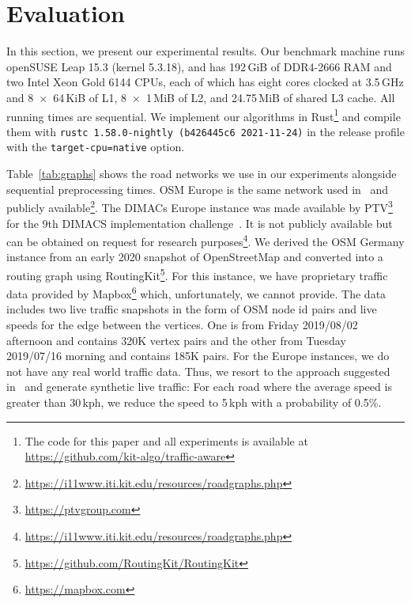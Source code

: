 \documentclass[a4paper,UKenglish,cleveref, autoref, thm-restate]{lipics-v2021}
\begin{document}
\section{Evaluation}\label{sec:eval}

In this section, we present our experimental results.
Our benchmark machine runs openSUSE Leap 15.3 (kernel 5.3.18), and has 192\,GiB of DDR4-2666 RAM and two Intel Xeon Gold 6144 CPUs, each of which has eight cores clocked at 3.5\,GHz and 8~$\times$~64\,KiB of L1, 8~$\times$~1\,MiB of L2, and 24.75\,MiB of shared L3 cache.
All running times are sequential.
We implement our algorithms in Rust\footnote{The code for this paper and all experiments is available at \url{https://github.com/kit-algo/traffic-aware}} and compile them with \texttt{rustc 1.58.0-nightly (b426445c6 2021-11-24)} in the release profile with the \texttt{target-cpu=native} option.

\begin{table}
\centering
\caption{
Instances used in the evaluation with sequential preprocessing running times to construct a CCH-Potential.
Phase 1 needs to be run only once for each graph, Phase 2 once for each metric, or when a metric changes.
}\label{tab:graphs}

\end{table}

Table~\ref{tab:graphs} shows the road networks we use in our experiments alongside sequential preprocessing times.
OSM Europe is the same network used in~\cite{dss-tarrn-18} and publicly available\footnote{\url{https://i11www.iti.kit.edu/resources/roadgraphs.php}}.
The DIMACs Europe instance was made available by PTV\footnote{\url{https://ptvgroup.com}} for the 9th DIMACS implementation challenge~\cite{DemetrescuGJ09}.
It is not publicly available but can be obtained on request for research purposes\footnote{\url{https://i11www.iti.kit.edu/resources/roadgraphs.php}}.
We derived the OSM Germany instance from an early 2020 snapshot of OpenStreetMap and converted into a routing graph using RoutingKit\footnote{\url{https://github.com/RoutingKit/RoutingKit}}.
For this instance, we have proprietary traffic data provided by Mapbox\footnote{\url{https://mapbox.com}} which, unfortunately, we cannot provide.
The data includes two live traffic snapshots in the form of OSM node id pairs and live speeds for the edge between the vertices.
One is from Friday 2019/08/02 afternoon and contains 320K vertex pairs and the other from Tuesday 2019/07/16 morning and contains 185K pairs.
For the Europe instances, we do not have any real world traffic data.
Thus, we resort to the approach suggested in~\cite{dss-tarrn-18} and generate synthetic live traffic:
For each road where the average speed is greater than 30\,kph, we reduce the speed to 5\,kph with a probability of 0.5\%.
\end{document}
